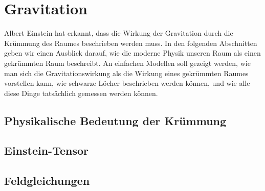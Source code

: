 %
%
%
\chapter{Gravitation%
\label{skript:kruemmusng:sectipn:gravitation}}
\rhead{}
Albert Einstein hat erkannt, dass die Wirkung der Gravitation 
durch die Krümmung des Raumes beschrieben werden muss.
In den folgenden Abschnitten geben wir einen Ausblick darauf, wie
die moderne Physik unseren Raum als einen gekrümmten Raum beschreibt.
An einfachen Modellen soll gezeigt werden, wie man sich die Gravitationswirkung
als die Wirkung eines gekrümmten Raumes vorstellen kann, wie schwarze Löcher
beschrieben werden können, und wie alle diese Dinge tatsächlich gemessen
werden können.

%


\section{Physikalische Bedeutung der Krümmung}

\section{Einstein-Tensor}

\section{Feldgleichungen}

%

